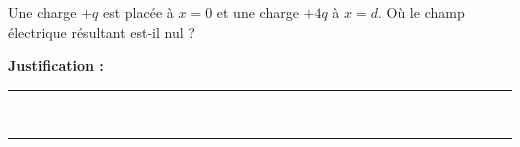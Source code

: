 Une charge $+q$ est placée à $x = 0$ et une charge $+4q$ à $x = d$. Où le champ électrique résultant est-il nul ?

\choices

\noindent\textbf{Justification :} \hrulefill \\[2.5ex]
\rule{\linewidth}{0.4pt} \\[2.5ex]
\rule{\linewidth}{0.4pt}
\vfill
